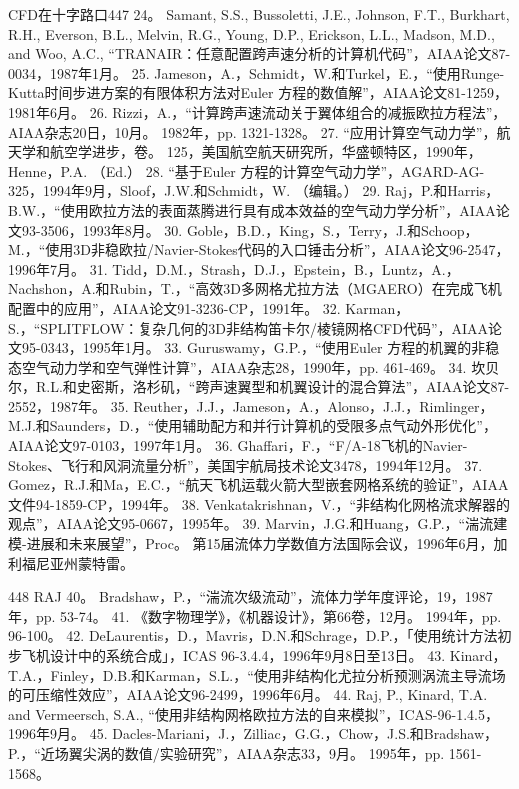 \documentclass[UTF8,11pt,a4paper,openany,fontset=fandol]{ctexbook}
\begin{document}
CFD在十字路口447 24。 Samant, S.S., Bussoletti, J.E., Johnson, F.T., Burkhart, R.H., Everson, B.L., Melvin, R.G., Young, D.P., Erickson, L.L., Madson, M.D., and Woo, A.C., “TRANAIR：任意配置跨声速分析的计算机代码”，AIAA论文87-0034，1987年1月。 25. Jameson，A.，Schmidt，W.和Turkel，E.，“使用Runge-Kutta时间步进方案的有限体积方法对Euler 方程的数值解”，AIAA论文81-1259，1981年6月。 26. Rizzi，A.，“计算跨声速流动关于翼体组合的减振欧拉方程法”，AIAA杂志20日，10月。 1982年，pp. 1321-1328。 27. “应用计算空气动力学”，航天学和航空学进步，卷。 125，美国航空航天研究所，华盛顿特区，1990年，Henne，P.A. （Ed.） 28. “基于Euler 方程的计算空气动力学”，AGARD-AG-325，1994年9月，Sloof，J.W.和Schmidt，W. （编辑。） 29. Raj，P.和Harris，B.W.，“使用欧拉方法的表面蒸腾进行具有成本效益的空气动力学分析”，AIAA论文93-3506，1993年8月。 30. Goble，B.D.，King，S.，Terry，J.和Schoop，M.，“使用3D非稳欧拉/Navier-Stokes代码的入口锤击分析”，AIAA论文96-2547，1996年7月。 31. Tidd，D.M.，Strash，D.J.，Epstein，B.，Luntz，A.，Nachshon，A.和Rubin，T.，“高效3D多网格尤拉方法（MGAERO）在完成飞机配置中的应用”，AIAA论文91-3236-CP，1991年。 32. Karman，S.，“SPLITFLOW：复杂几何的3D非结构笛卡尔/棱镜网格CFD代码”，AIAA论文95-0343，1995年1月。 33. Guruswamy，G.P.，“使用Euler 方程的机翼的非稳态空气动力学和空气弹性计算”，AIAA杂志28，1990年，pp. 461-469。 34. 坎贝尔，R.L.和史密斯，洛杉矶，“跨声速翼型和机翼设计的混合算法”，AIAA论文87-2552，1987年。 35. Reuther，J.J.，Jameson，A.，Alonso，J.J.，Rimlinger，M.J.和Saunders，D.，“使用辅助配方和并行计算机的受限多点气动外形优化”，AIAA论文97-0103，1997年1月。 36. Ghaffari，F.，“F/A-18飞机的Navier-Stokes、飞行和风洞流量分析”，美国宇航局技术论文3478，1994年12月。 37. Gomez，R.J.和Ma，E.C.，“航天飞机运载火箭大型嵌套网格系统的验证”，AIAA文件94-1859-CP，1994年。 38. Venkatakrishnan，V.，“非结构化网格流求解器的观点”，AIAA论文95-0667，1995年。 39. Marvin，J.G.和Huang，G.P.，“湍流建模-进展和未来展望”，Proc。 第15届流体力学数值方法国际会议，1996年6月，加利福尼亚州蒙特雷。

448 RAJ 40。 Bradshaw，P.，“湍流次级流动”，流体力学年度评论，19，1987年，pp. 53-74。 41. 《数字物理学》，《机器设计》，第66卷，12月。 1994年，pp. 96-100。 42. DeLaurentis，D.，Mavris，D.N.和Schrage，D.P.，「使用统计方法初步飞机设计中的系统合成」，ICAS 96-3.4.4，1996年9月8日至13日。 43. Kinard，T.A.，Finley，D.B.和Karman，S.L.，“使用非结构化尤拉分析预测涡流主导流场的可压缩性效应”，AIAA论文96-2499，1996年6月。 44. Raj, P., Kinard, T.A. and Vermeersch, S.A., “使用非结构网格欧拉方法的自来模拟”，ICAS-96-1.4.5，1996年9月。 45. Dacles-Mariani，J.，Zilliac，G.G.，Chow，J.S.和Bradshaw，P.，“近场翼尖涡的数值/实验研究”，AIAA杂志33，9月。 1995年，pp. 1561-1568。
\end{document}
